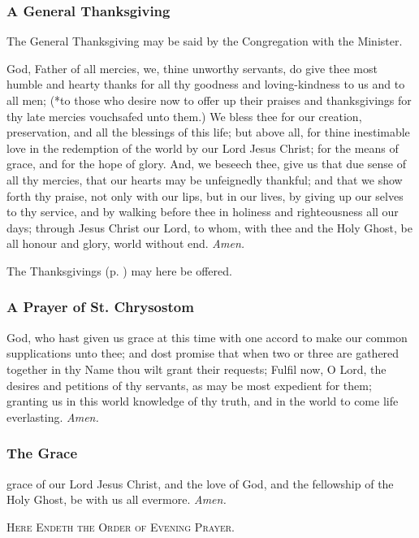 \subsubsection{A General Thanksgiving}
\begin{rubric}
    The General Thanksgiving may be said by the Congregation with the Minister.
\end{rubric}
 God, Father of all mercies, we, thine unworthy servants, do give thee most humble and hearty thanks for all thy goodness and loving-kindness to us and to all men; (*to those who desire now to offer up their praises and thanksgivings for thy late mercies vouchsafed unto them.) We bless thee for our creation, preservation, and all the blessings of this life; but above all, for thine inestimable love in the redemption of the world by our Lord Jesus Christ; for the means of grace, and for the hope of glory. And, we beseech thee, give us that due sense of all thy mercies, that our hearts may be unfeignedly thankful; and that we show forth thy praise, not only with our lips, but in our lives, by giving up our selves to thy service, and by walking before thee in holiness and righteousness all our days; through Jesus Christ our Lord, to whom, with thee and the Holy Ghost, be all honour and glory, world without end. \textit{Amen.}

\begin{rubric}
    The Thanksgivings (p. \pageref{thanksgiving}) may here be offered.
\end{rubric}

\subsubsection{A Prayer of St. Chrysostom}
 God, who hast given us grace at this time with one accord to make our common supplications unto thee; and dost promise that when two or three are gathered together in thy Name thou wilt grant their requests; Fulfil now, O Lord, the desires and petitions of thy servants, as may be most expedient for them; granting us in this world knowledge of thy truth, and in the world to come life everlasting. \textit{Amen.}
\subsubsection{The Grace}
 grace of our Lord Jesus Christ, {} and the love of God, and the fellowship of the Holy Ghost, be with us all evermore. \textit{Amen.}


\begin{center}
    \textsc{Here Endeth the Order of Evening Prayer.}
\end{center}